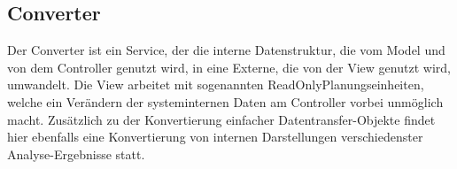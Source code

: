 \subsection{Converter}\label{subsec:converter}
Der Converter ist ein Service, der die interne Datenstruktur, die vom Model und von dem Controller genutzt wird,
in eine Externe, die von der View genutzt wird, umwandelt.
Die View arbeitet mit sogenannten ReadOnlyPlanungseinheiten, welche ein Verändern der systeminternen
Daten am Controller vorbei unmöglich macht.
Zusätzlich zu der Konvertierung einfacher Datentransfer-Objekte findet hier ebenfalls eine
Konvertierung von internen Darstellungen verschiedenster Analyse-Ergebnisse statt.
